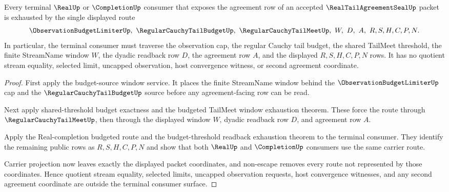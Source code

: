 \begin{theorem}
\label{thm:real-tail-agreement-seal-terminal-consumer-route-exhaustion}
Every terminal $\RealUp$ or $\CompletionUp$ consumer that exposes the agreement row of an accepted $\RealTailAgreementSealUp$ packet is exhausted by the single displayed route
$$
\ObservationBudgetLimiterUp,\ \RegularCauchyTailBudgetUp,\ \RegularCauchyTailMeetUp,\ W,\ D,\ A,\ R,S,H,C,P,N.
$$
In particular, the terminal consumer must traverse the observation cap, the regular Cauchy tail budget, the shared TailMeet threshold, the finite StreamName window $W$, the dyadic readback row $D$, the agreement row $A$, and the displayed $R,S,H,C,P,N$ rows. It has no quotient stream equality, selected limit, uncapped observation, host convergence witness, or second agreement coordinate.
\end{theorem}
\begin{proof}
First apply the budget-source window service. It places the finite StreamName window behind the $\ObservationBudgetLimiterUp$ cap and the $\RegularCauchyTailBudgetUp$ source before any agreement-facing row can be read.

Next apply shared-threshold budget exactness and the budgeted TailMeet window exhaustion theorem. These force the route through $\RegularCauchyTailMeetUp$, then through the displayed window $W$, dyadic readback row $D$, and agreement row $A$.

Apply the Real-completion budgeted route and the budget-threshold readback exhaustion theorem to the terminal consumer. They identify the remaining public rows as $R,S,H,C,P,N$ and show that both $\RealUp$ and $\CompletionUp$ consumers use the same carrier route.

Carrier projection now leaves exactly the displayed packet coordinates, and non-escape removes every route not represented by those coordinates. Hence quotient stream equality, selected limits, uncapped observation requests, host convergence witnesses, and any second agreement coordinate are outside the terminal consumer surface.
\end{proof}

